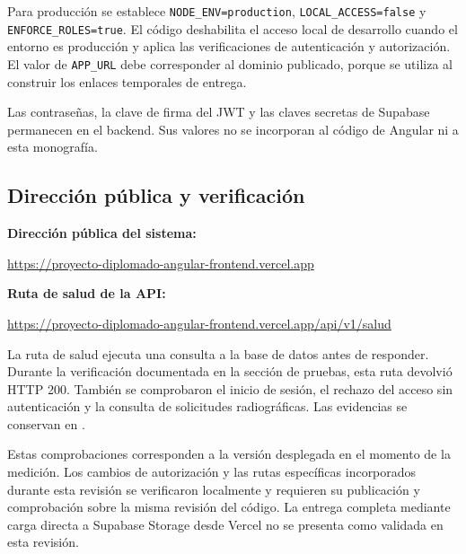 Para producción se establece \texttt{NODE\_ENV=production},
\texttt{LOCAL\_ACCESS=false} y \texttt{ENFORCE\_ROLES=true}.
El código deshabilita el acceso local de desarrollo cuando el entorno
es producción y aplica las verificaciones de autenticación y autorización.
El valor de \texttt{APP\_URL} debe corresponder al dominio publicado,
porque se utiliza al construir los enlaces temporales de entrega.

Las contraseñas, la clave de firma del JWT y las claves secretas de
Supabase permanecen en el backend. Sus valores no se incorporan al
código de Angular ni a esta monografía.

\subsection{Dirección pública y verificación}

\textbf{Dirección pública del sistema:}

\url{https://proyecto-diplomado-angular-frontend.vercel.app}

\textbf{Ruta de salud de la API:}

\url{https://proyecto-diplomado-angular-frontend.vercel.app/api/v1/salud}

La ruta de salud ejecuta una consulta a la base de datos antes de
responder. Durante la verificación documentada en la sección de pruebas,
esta ruta devolvió HTTP 200. También se comprobaron el inicio de sesión,
el rechazo del acceso sin autenticación y la consulta de solicitudes
radiográficas. Las evidencias se conservan en
.

Estas comprobaciones corresponden a la versión desplegada en el momento
de la medición. Los cambios de autorización y las rutas específicas
incorporados durante esta revisión se verificaron localmente y requieren
su publicación y comprobación sobre la misma revisión del código.
La entrega completa mediante carga directa a Supabase Storage desde
Vercel no se presenta como validada en esta revisión.
